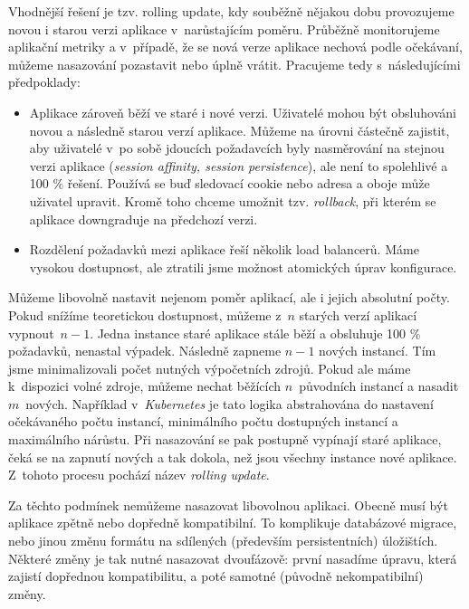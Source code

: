             Vhodnější řešení je tzv. rolling update, kdy souběžně nějakou dobu provozujeme novou i starou verzi aplikace v~narůstajícím poměru. Průběžně monitorujeme aplikační metriky a v~případě, že se nová verze aplikace nechová podle očekávaní, můžeme nasazování pozastavit nebo úplně vrátit. Pracujeme tedy s~následujícími předpoklady:
            \begin{itemize}
                \item Aplikace zároveň běží ve staré i nové verzi. Uživatelé mohou být obsluhováni novou a následně starou verzí aplikace.  Můžeme na úrovni  částečně zajistit, aby uživatelé v~po sobě jdoucích požadavcích byly nasměrování na stejnou verzi aplikace (\textit{session affinity, session persistence}), ale není to spolehlivé a 100 \% řešení. Používá se buď sledovací cookie nebo  adresa a oboje může uživatel upravit. Kromě toho chceme umožnit tzv. \textit{rollback}, při kterém se aplikace downgraduje na předchozí verzi.
                \item Rozdělení požadavků mezi aplikace řeší několik load balancerů. Máme vysokou dostupnost, ale ztratili jsme možnost atomických úprav konfigurace.
            \end{itemize}

            Můžeme libovolně nastavit nejenom poměr aplikací, ale i jejich absolutní počty. Pokud snížíme teoretickou dostupnost, můžeme z~$n$ starých verzí aplikací vypnout~${n-1}$. Jedna instance staré aplikace stále běží a obsluhuje 100 \% požadavků, nenastal výpadek. Následně zapneme ${n-1}$ nových instancí. Tím jsme minimalizovali počet nutných výpočetních zdrojů. Pokud ale máme k~dispozici volné zdroje, můžeme nechat běžících $n$~původních instancí a nasadit $m$~nových. Například v~\textit{Kubernetes} je tato logika abstrahována do nastavení očekávaného počtu instancí, minimálního počtu dostupných instancí a maximálního nárůstu. Při nasazování se pak postupně vypínají staré aplikace, čeká se na zapnutí nových a tak dokola, než jsou všechny instance nové aplikace. Z~tohoto procesu pochází název \textit{rolling update}.

            Za těchto podmínek nemůžeme nasazovat libovolnou aplikaci. Obecně musí být aplikace zpětně nebo dopředně kompatibilní. To komplikuje databázové migrace, nebo jinou změnu formátu na sdílených (především persistentních) úložištích. Některé změny je tak nutné nasazovat dvoufázově: první nasadíme úpravu, která zajistí dopřednou kompatibilitu, a poté samotné (původně nekompatibilní) změny.


